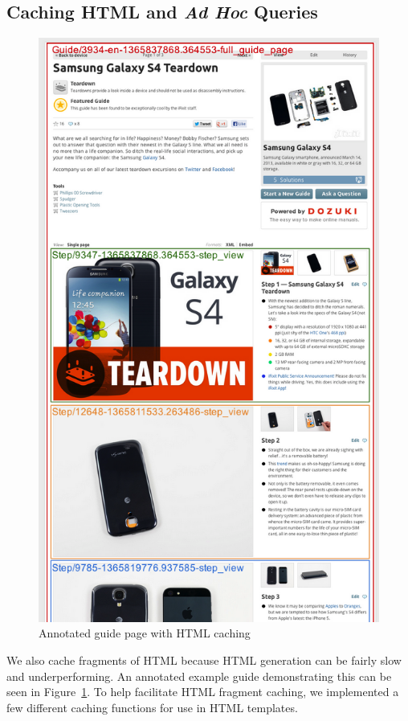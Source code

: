 \documentclass[12pt]{ucthesis}
\begin{document}
\subsection{Caching HTML and \textit{Ad Hoc} Queries}
\begin{figure}[hbtp]
\centering
\includegraphics[width=\textwidth,height=0.95\textheight]{assets/annotatedCachedGuidePage.png}
\caption{Annotated guide page with HTML caching}
\label{fig:annotatedCachedGuidePage}
\end{figure}

We also cache fragments of HTML because HTML generation can be fairly slow and underperforming.
An annotated example guide demonstrating this can be seen in Figure~\ref{fig:annotatedCachedGuidePage}.
To help facilitate HTML fragment caching, we implemented a few different caching functions for use in HTML templates.
\end{document}
